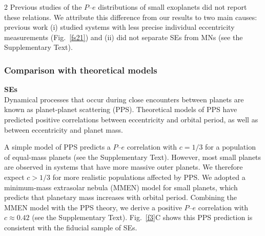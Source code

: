 \documentclass[10pt]{article}
\begin{document}
\begin{multicols}{2}
Previous studies of the $P$--$e$ distributions of small exoplanets\cite{2015ApJ...808..126V,2019AJ....157...61V,2020A&A...635A..37C,2024AJ....168..115B} did not report these relations.
We attribute this difference from our results to two main causes: previous work (i) studied systems with less precise individual eccentricity measurements (Fig.~\ref{fs21}) and (ii) did not separate SEs from MNs (see the Supplementary Text).

\subsubsection*{Comparison with theoretical models}
{\noindent \bf SEs}\\
Dynamical processes that occur during close encounters between planets are known as planet-planet scattering (PPS).
Theoretical models of PPS have predicted positive correlations between eccentricity and orbital period, as well as between eccentricity and planet mass\cite{2008ApJ...686..621F,2008ApJ...686..580C,2025ApJ...991L..49K}.

A simple model of PPS predicts a $P$--$e$ correlation with $c=1/3$ for a population of equal-mass planets (see the Supplementary Text).
However, most small planets are observed in systems that have more massive outer planets\cite{2013ApJ...763...41C,2022MNRAS.514.3844C}.
We therefore expect $c>1/3$ for more realistic populations affected by PPS.
We adopted a minimum-mass extrasolar nebula (MMEN) model for small planets, which predicts that planetary mass increases with orbital period\cite{2020AJ....159..247D}.
Combining the MMEN model with the PPS theory, we derive a positive $P$--$e$ correlation with $c\approx0.42$ (see the Supplementary Text).
Fig.~\ref{f3}C shows this PPS prediction is consistent with the fiducial sample of SEs.
\end{multicols}
\end{document}

